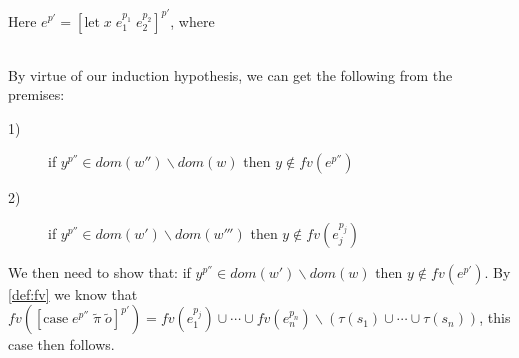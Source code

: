\item[\runa{Case}] Here $e^{p'}=[\mbox{let}\;x\;e_1^{p_1}\;e_2^{p_2}]^{p'}$, where
\begin{figure}[H]
	\setlength\tabcolsep{8pt}
	\begin{tabular}{l}
		
	\end{tabular}
\end{figure}
By virtue of our induction hypothesis, we can get the following from the premises:
\begin{description}
	\item[1)] if $y^{p''}\in dom(w'')\backslash dom(w)$ then $y\notin fv(e^{p''})$
	\item[2)] if $y^{p''}\in dom(w')\backslash dom(w''')$ then $y\notin fv(e_j^{p_j})$
\end{description}
We then need to show that: if $y^{p''}\in dom(w')\backslash dom(w)$ then $y\notin fv(e^{p'})$.
By \cref{def:fv} we know that $fv([\mbox{case}\;e^{p''}\;\tilde{\pi}\;\tilde{o}]^{p'})=fv(e_1^{p_j})\cup\cdots\cup fv(e_n^{p_n})\backslash(\tau(s_1)\cup\cdots\cup\tau(s_n))$, this case then follows.
